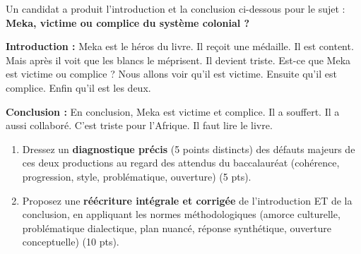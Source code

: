 \documentclass[11pt]{article}
\begin{document}
\begin{exercice}
Un candidat a produit l'introduction et la conclusion ci-dessous pour le sujet : \og \textbf{Meka, victime ou complice du système colonial ?} \fg{}

\textbf{Introduction :} \og Meka est le héros du livre. Il reçoit une médaille. Il est content. Mais après il voit que les blancs le méprisent. Il devient triste. Est-ce que Meka est victime ou complice ? Nous allons voir qu'il est victime. Ensuite qu'il est complice. Enfin qu'il est les deux. \fg{}

\textbf{Conclusion :} \og En conclusion, Meka est victime et complice. Il a souffert. Il a aussi collaboré. C'est triste pour l'Afrique. Il faut lire le livre. \fg{}

\begin{enumerate}
    \item Dressez un \textbf{diagnostique précis} (5 points distincts) des défauts majeurs de ces deux productions au regard des attendus du baccalauréat (cohérence, progression, style, problématique, ouverture) (5 pts).
    \item Proposez une \textbf{réécriture intégrale et corrigée} de l'introduction ET de la conclusion, en appliquant les normes méthodologiques (amorce culturelle, problématique dialectique, plan nuancé, réponse synthétique, ouverture conceptuelle) (10 pts).
\end{enumerate}
\end{exercice}
\end{document}
